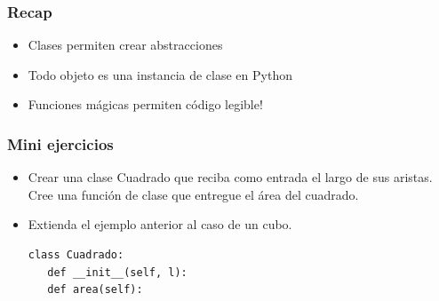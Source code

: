 \documentclass[14pt,aspectratio=169,xcolor=dvipsnames]{beamer}
\begin{document}
\begin{frame}\frametitle{Recap}
    \begin{itemize}
        \item Clases permiten crear abstracciones
        \item Todo objeto es una instancia de clase en Python
        \item Funciones mágicas permiten código legible!
    \end{itemize}
\end{frame}
\begin{frame}
    \maketitle
\end{frame}
\begin{frame}[noframenumbering]\frametitle{Mini ejercicios}
    \begin{itemize}
        \item Crear una clase Cuadrado que reciba como entrada el largo de sus aristas. Cree una función de clase que entregue el área del cuadrado.
        \item Extienda el ejemplo anterior al caso de un cubo.
    \begin{footnotesize}
    \begin{verbatim}
class Cuadrado:
   def __init__(self, l):
   def area(self):
    \end{verbatim}
    \end{footnotesize}

    \end{itemize}
\end{frame}
\end{document}
